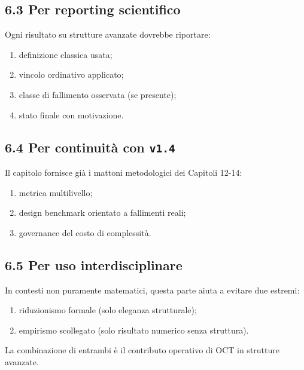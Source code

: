 \subsection{6.3 Per reporting scientifico}

Ogni risultato su strutture avanzate dovrebbe riportare:

\begin{enumerate}
\def\labelenumi{\arabic{enumi}.}
\tightlist
\item
  definizione classica usata;
\item
  vincolo ordinativo applicato;
\item
  classe di fallimento osservata (se presente);
\item
  stato finale con motivazione.
\end{enumerate}

\subsection{\texorpdfstring{6.4 Per continuità con \texttt{v1.4}}{6.4 Per continuità con v1.4}}

Il capitolo fornisce già i mattoni metodologici dei Capitoli 12-14:

\begin{enumerate}
\def\labelenumi{\arabic{enumi}.}
\tightlist
\item
  metrica multilivello;
\item
  design benchmark orientato a fallimenti reali;
\item
  governance del costo di complessità.
\end{enumerate}

\subsection{6.5 Per uso interdisciplinare}

In contesti non puramente matematici, questa parte aiuta a evitare due estremi:

\begin{enumerate}
\def\labelenumi{\arabic{enumi}.}
\tightlist
\item
  riduzionismo formale (solo eleganza strutturale);
\item
  empirismo scollegato (solo risultato numerico senza struttura).
\end{enumerate}

La combinazione di entrambi è il contributo operativo di OCT in strutture avanzate.

